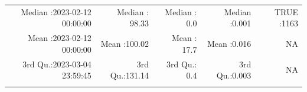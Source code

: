 \documentclass[
  10pt,
  a4paper,oneside]{article}
\begin{document}
\begin{longtable}[]{@{}rrrrr@{}}
\begin{minipage}[t]{0.26\columnwidth}\raggedleft
Median :2023-02-12 00:00:00\strut
\end{minipage} & \begin{minipage}[t]{0.15\columnwidth}\raggedleft
Median : 98.33\strut
\end{minipage} & \begin{minipage}[t]{0.17\columnwidth}\raggedleft
Median : 0.0\strut
\end{minipage} & \begin{minipage}[t]{0.14\columnwidth}\raggedleft
Median :0.001\strut
\end{minipage} & \begin{minipage}[t]{0.14\columnwidth}\raggedleft
TRUE :1163\strut
\end{minipage}\tabularnewline
\begin{minipage}[t]{0.26\columnwidth}\raggedleft
Mean :2023-02-12 00:00:00\strut
\end{minipage} & \begin{minipage}[t]{0.15\columnwidth}\raggedleft
Mean :100.02\strut
\end{minipage} & \begin{minipage}[t]{0.17\columnwidth}\raggedleft
Mean : 17.7\strut
\end{minipage} & \begin{minipage}[t]{0.14\columnwidth}\raggedleft
Mean :0.016\strut
\end{minipage} & \begin{minipage}[t]{0.14\columnwidth}\raggedleft
NA\strut
\end{minipage}\tabularnewline
\begin{minipage}[t]{0.26\columnwidth}\raggedleft
3rd Qu.:2023-03-04 23:59:45\strut
\end{minipage} & \begin{minipage}[t]{0.15\columnwidth}\raggedleft
3rd Qu.:131.14\strut
\end{minipage} & \begin{minipage}[t]{0.17\columnwidth}\raggedleft
3rd Qu.: 0.4\strut
\end{minipage} & \begin{minipage}[t]{0.14\columnwidth}\raggedleft
3rd Qu.:0.003\strut
\end{minipage} & \begin{minipage}[t]{0.14\columnwidth}\raggedleft
NA\strut
\end{minipage}\tabularnewline
\begin{minipage}[t]{0.26\columnwidth}\raggedleft

\end{minipage}
\end{longtable}
\end{document}

